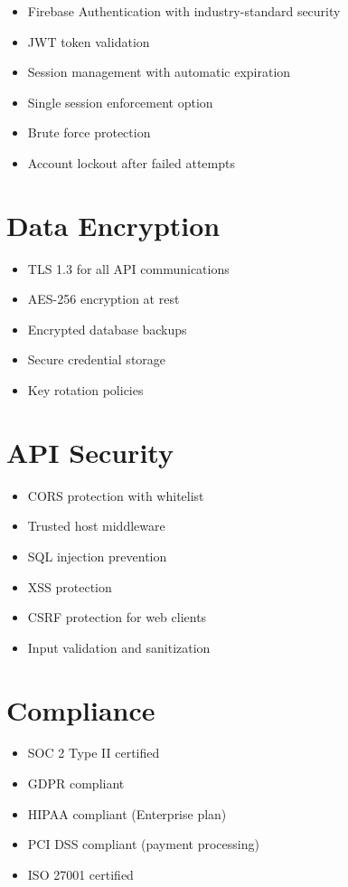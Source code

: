 \documentclass[11pt,a4paper]{report}
\begin{document}
\begin{itemize}[leftmargin=*]
    \item Firebase Authentication with industry-standard security
    \item JWT token validation
    \item Session management with automatic expiration
    \item Single session enforcement option
    \item Brute force protection
    \item Account lockout after failed attempts
\end{itemize}

\section{Data Encryption}

\begin{itemize}[leftmargin=*]
    \item TLS 1.3 for all API communications
    \item AES-256 encryption at rest
    \item Encrypted database backups
    \item Secure credential storage
    \item Key rotation policies
\end{itemize}

\section{API Security}

\begin{itemize}[leftmargin=*]
    \item CORS protection with whitelist
    \item Trusted host middleware
    \item SQL injection prevention
    \item XSS protection
    \item CSRF protection for web clients
    \item Input validation and sanitization
\end{itemize}

\section{Compliance}

\begin{itemize}[leftmargin=*]
    \item SOC 2 Type II certified
    \item GDPR compliant
    \item HIPAA compliant (Enterprise plan)
    \item PCI DSS compliant (payment processing)
    \item ISO 27001 certified
\end{itemize}
\end{document}
